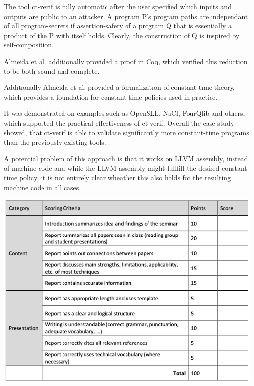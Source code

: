 \documentclass[a4paper,UKenglish]{lipics-v2018}
\begin{document}
The tool ct-verif is fully automatic after the user specified which inputs and outputs are public to an attacker. A program P's program paths are independant of all program-secrets if assertion-safety of a program Q that is essentially a product of the P with itself holds.\cite{verifying_constant_time_implementations} Clearly, the construction of Q is inspired by self-composition. 

Almeida et al. additionally provided a proof in Coq, which verified this reduction to be both sound and complete.\cite{verifying_constant_time_implementations}

Additionally Almeida et al. provided a formalization of constant-time theory, which provides a foundation for constant-time policies used in practice.

It was demonstrated on examples such as OpenSLL, NaCl, FourQlib and others, which supported the practical effectiveness of ct-verif. Overall the case study showed, that ct-verif is able to validate significantly more constant-time programs than the previously existing tools.\cite{verifying_constant_time_implementations}

A potential problem of this approach is that it works on LLVM assembly, instead of machine code and while the LLVM assembly might fullfill the desired constant time policy, it is not entirely clear wheather this also holds for the resulting machine code in all cases.\cite{verifying_constant_time_implementations}

\newpage
\includegraphics[scale = 0.72]{pictures/grading_scheme}\\

\newpage

\end{document}
